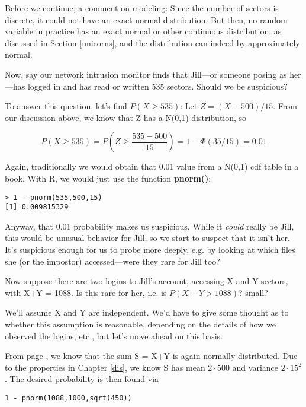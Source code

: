 Before we continue, a comment on modeling: Since the number of sectors
is discrete, it could not have an exact normal distribution. But then,
no random variable in practice has an exact normal or other continuous
distribution, as discussed in Section \ref{unicorns}, and the
distribution can indeed by approximately normal.

Now, say our network intrusion monitor finds that Jill---or someone
posing as her---has logged in and has read or written 535 sectors.
Should we be suspicious?  

To answer this question, let's find $P(X \geq 535)$:  Let $Z =
(X-500)/15$.  From our discussion above, we know that Z has a N(0,1)
distribution, so

\begin{equation}
P(X \geq 535) = P \left (Z \geq \frac{535-500}{15} \right ) 
= 1 - \Phi(35/15) = 0.01
\end{equation}

Again, traditionally we would obtain that 0.01 value from a N(0,1) cdf
table in a book.  With R, we would just use the function {\bf pnorm()}:

\begin{Verbatim}[fontsize=\relsize{-2}]
> 1 - pnorm(535,500,15)
[1] 0.009815329
\end{Verbatim}

Anyway, that 0.01 probability makes us suspicious.  While it {\it could}
really be Jill, this would be unusual behavior for Jill, so we start to
suspect that it isn't her.  It's suspicious enough for us to probe more
deeply, e.g. by looking at which files she (or the impostor)
accessed---were they rare for Jill too?

Now suppose there are two logins to Jill's account, accessing X and Y
sectors, with X+Y = 1088.  Is this rare for her, i.e. is $P(X+Y >
1088)$? small? 

We'll assume X and Y are independent.  We'd have to give some thought as
to whether this assumption is reasonable, depending on the details of
how we observed the logins, etc., but let's move ahead on this basis.

From page \pageref{sumindep}, we know that the sum S = X+Y is again normally
distributed.  Due to the properties in Chapter \ref{dis}, we know S has
mean $2 \cdot 500$ and variance $2 \cdot 15^2$.  The desired
probability is then found via

\begin{lstlisting}
1 - pnorm(1088,1000,sqrt(450))
\end{lstlisting}

